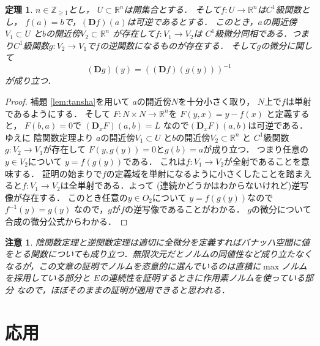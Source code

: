 \documentclass[leqno, a4paper, 12pt]{jsarticle}
\newtheorem{thm}{定理}
\newtheorem*{rmk}{注意}
\newcommand{\zz}{\mathbb{Z}}
\newcommand{\rr}{\mathbb{R}}
\newcommand{\ddd}{\mathbf{D}}
\begin{document}
\begin{thm}\label{thm:inv}
$n\in \zz_{\ge 1}$とし，
$U\subset \rr^{n}$は開集合とする．
そして$f: U\to \rr^{n}$は$C^{1}$級関数とし，
$f(a)=b$で，$(\ddd f)(a)$は可逆であるとする．
このとき，$a$の開近傍$V_{1}\subset U$
と$b$の開近傍$V_{2}\subset \rr^{n}$
が存在して$f: V_{1}\to V_{2}$は
$C^{1}$級微分同相である．つまり$C^{1}$級関数$g: V_{2}\to V_{1}$で$f$の逆関数になるものが存在する．
そして$g$の微分に関して
\[
(\ddd g)(y)=((\ddd f)(g(y)))^{-1}
\]
が成り立つ．
\end{thm}
\begin{proof}
補題 \ref{lem:tansha}を用いて
$a$の開近傍$N$を十分小さく取り，
$N$上で$f$は単射であるようにする．
そして
$F: N\times N\to \rr^{n}$を
$F(y, x)=y-f(x)$
と定義すると，
$F(b, a)=0$で
$(\ddd_{x} F)(a, b)=L$
なので$(\ddd_{x} F)(a, b)$は可逆である．
ゆえに
陰関数定理より
$a$の開近傍$V_{1}\subset U$
と$b$の開近傍$V_{2}\subset \rr^{n}$
と
$C^{1}$級関数$g: V_{2}\to V_{1}$が存在して
$F(y, g(y))=0$と$g(b)=a$が成り立つ．
つまり任意の$y\in V_{2}$について
$y=f(g(y))$である．
これは$f: V_{1}\to V_{2}$が全射であることを意味する．
証明の始まりで$f$の定義域を単射になるように小さくしたことを踏まえると$f: V_{1}\to V_{2}$は全単射である．よって
(連続かどうかはわからないけれど)逆写像が存在する．
このとき任意の$y\in O_{2}$について
$y=f(g(y))$なので$f^{-1}(y)=g(y)$
なので，$g$が$f$の逆写像であることがわかる．
$g$の微分について合成の微分公式からわかる．
\end{proof}


\begin{rmk}
陰関数定理と逆関数定理は適切に全微分を定義すればバナッハ空間に値をとる関数についても成り立つ．無限次元だとノルムの同値性など成り立たなくなるが，この文章の証明でノルムを恣意的に選んでいるのは直積に$\max$ノルムを採用している部分と
$E$の連続性を証明するときに作用素ノルムを使っている部分
なので，ほぼそのままの証明が適用できると思われる．
\end{rmk}


\section{応用}
\end{document}

